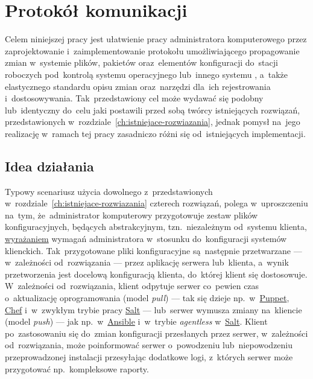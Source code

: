 \documentclass[thesis]{subfiles}
\begin{document}
\chapter{Protokół komunikacji}
\label{ch:protokol}

Celem niniejszej pracy jest ułatwienie pracy administratora komputerowego przez zaprojektowanie i~zaimplementowanie protokołu umożliwiającego propagowanie zmian w~systemie plików, pakietów oraz~elementów konfiguracji do~stacji roboczych pod~kontrolą systemu operacyjnego  lub~innego systemu , a~także elastycznego standardu opisu zmian oraz~narzędzi dla~ich rejestrowania i~dostosowywania. Tak~przedstawiony cel może wydawać się podobny lub~identyczny do~celu jaki postawili przed sobą twórcy istniejących rozwiązań, przedstawionych w~rozdziale~\ref{ch:istniejace-rozwiazania}, jednak pomysł na~jego realizację w~ramach tej pracy zasadniczo różni się od~istniejących implementacji.


\section{Idea działania}

Typowy scenariusz użycia dowolnego z~przedstawionych w~rozdziale~\ref{ch:istniejace-rozwiazania} czterech rozwiązań, polega w~uproszczeniu na~tym, że~administrator komputerowy przygotowuje zestaw plików konfiguracyjnych, będących abstrakcyjnym, tzn.~niezależnym od~systemu klienta, \href{https://martinfowler.com/bliki/DomainSpecificLanguage.html}{wyrażaniem} wymagań administratora w~stosunku do~konfiguracji systemów klienckich. Tak~przygotowane pliki konfiguracyjne są~następnie przetwarzane --- w~zależności od~rozwiązania --- przez aplikację serwera lub~klienta, a~wynik przetworzenia jest docelową konfiguracją klienta, do~której klient się dostosowuje. W~zależności od~rozwiązania, klient odpytuje serwer co~pewien czas o~aktualizację oprogramowania (model \emph{pull}) --- tak się dzieje np.~w~\hyperref[sec:puppet]{Puppet}, \hyperref[sec:chef]{Chef} i~w~zwykłym trybie pracy \hyperref[sec:salt]{Salt} --- lub~serwer wymusza zmiany na~kliencie (model \emph{push}) --- jak np.~w~\hyperref[sec:ansible]{Ansible} i~w~trybie \emph{agentless} w~\hyperref[sec:salt]{Salt}. Klient po~zastosowaniu się do~zmian konfiguracji przesłanych przez serwer, w~zależności od~rozwiązania, może poinformować serwer o~powodzeniu lub~niepowodzeniu przeprowadzonej instalacji przesyłając dodatkowe logi, z~których serwer może przygotować np.~kompleksowe raporty.
\end{document}
